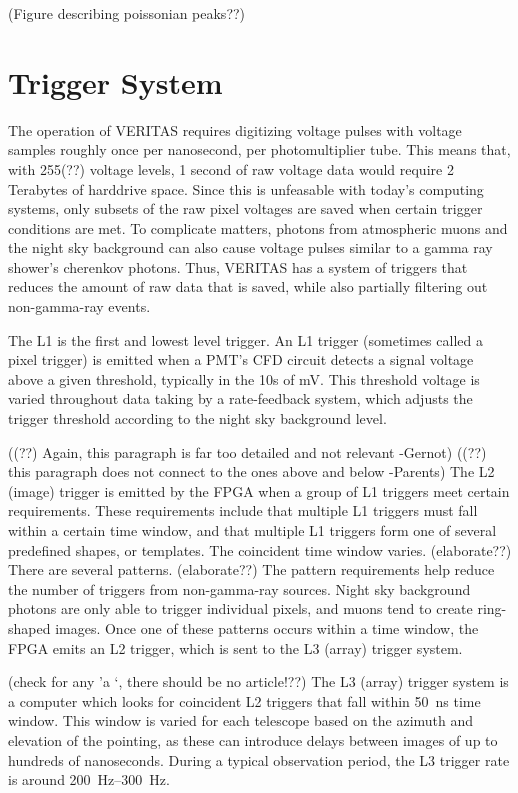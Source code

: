 {\color{red}(Figure describing poissonian peaks??)}



\section{Trigger System}\label{sec:trig}

The operation of VERITAS requires digitizing voltage pulses with voltage samples roughly once per nanosecond, per photomultiplier tube.
This means that, with 255{\color{red}(??)} voltage levels, 1 second of raw voltage data would require 2 Terabytes of harddrive space.
Since this is unfeasable with today's computing systems, only subsets of the raw pixel voltages are saved when certain trigger conditions are met.
To complicate matters, photons from atmospheric muons and the night sky background can also cause voltage pulses similar to a gamma ray shower's cherenkov photons.
Thus, VERITAS has a system of triggers that reduces the amount of raw data that is saved, while also partially filtering out non-gamma-ray events.

The L1 is the first and lowest level trigger.
An L1 trigger (sometimes called a pixel trigger) is emitted when a PMT's CFD circuit detects a signal voltage above a given threshold, typically in the 10s of mV.
This threshold voltage is varied throughout data taking by a rate-feedback system, which adjusts the trigger threshold according to the night sky background level.

{\color{red}((??) Again, this paragraph is far too detailed and not relevant -Gernot)}
{\color{red}((??) this paragraph does not connect to the ones above and below -Parents)}
The L2 (image) trigger is emitted by the FPGA when a group of L1 triggers meet certain requirements.
These requirements include that multiple L1 triggers must fall within a certain time window, and that multiple L1 triggers form one of several predefined shapes, or templates.
The coincident time window varies. {\color{red}(elaborate??)}
There are several patterns. {\color{red}(elaborate??)}
The pattern requirements help reduce the number of triggers from non-gamma-ray sources.
Night sky background photons are only able to trigger individual pixels, and muons tend to create ring-shaped images.
Once one of these patterns occurs within a time window, the FPGA emits an L2 trigger, which is sent to the L3 (array) trigger system.

{\color{red}(check for any 'a \nicetilde`, there should be no article!??)}
The L3 (array) trigger system is a computer which looks for coincident L2 triggers that fall within \nicetilde\SI{50}{ns} time window.
This window is varied for each telescope based on the azimuth and elevation of the pointing, as these can introduce delays between images of up to hundreds of nanoseconds.
During a typical observation period, the L3 trigger rate is around \SIrange{200}{300}{Hz}.

